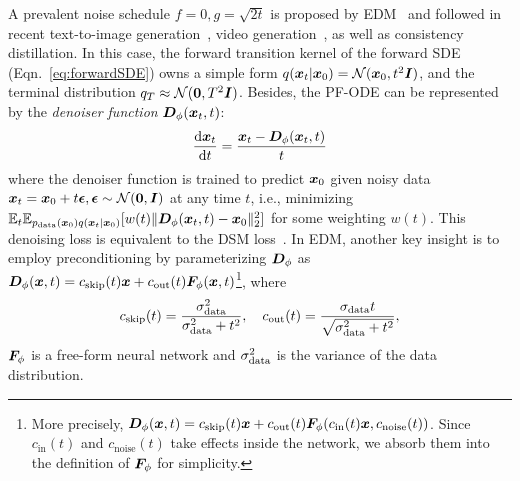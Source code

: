 A prevalent noise schedule $f=0,g=\sqrt{2t}$ is proposed by EDM~\citep{karras2022elucidating} and followed in recent text-to-image generation~\citep{esser2024scaling}, video generation~\citep{blattmann2023stable}, as well as consistency distillation. In this case, the forward transition kernel of the forward SDE (Eqn.~\eqref{eq:forwardSDE}) owns a simple form $q(\bm{x}_t|\bm{x}_0)=\mathcal N(\bm{x}_0,t^2\bm{I})$, and the terminal distribution $q_T\approx \mathcal N(\bm{0},T^2\bm{I})$. Besides, the PF-ODE can be represented by the \textit{denoiser function} $\bm{D}_\phi(\bm{x}_t,t)$:
\begin{equation}
\label{eq:teacher-ODE}
    \frac{\mathrm{d}\bm{x}_t}{\mathrm{d} t}=\frac{\bm{x}_t-\bm{D}_\phi(\bm{x}_t,t)}{t}
\end{equation}
where the denoiser function is trained to predict $\bm{x}_0$ given noisy data $\bm{x}_t=\bm{x}_0+t\bm{\epsilon},\bm{\epsilon}\sim\mathcal N(\bm{0},\bm{I})$ at any time $t$, i.e., minimizing $\mathbb{E}_t\mathbb{E}_{p_{\text{data}}(\bm{x}_0)q(\bm{x}_t|\bm{x}_0)}[w(t)\|\bm{D}_\phi(\bm{x}_t,t)-\bm{x}_0\|_2^2]$ for some weighting $w(t)$. This denoising loss is equivalent to the DSM loss~\citep{song2020score}. In EDM, another key insight is to employ preconditioning by parameterizing $\bm{D}_\phi$ as $\bm{D}_\phi(\bm{x},t)=c_{\text{skip}}(t)\bm{x}+c_{\text{out}}(t)\bm{F}_\phi(\bm{x},t)$\footnote{More precisely, $\bm{D}_\phi(\bm{x},t)=c_{\text{skip}}(t)\bm{x}+c_{\text{out}}(t)\bm{F}_\phi(c_{\text{in}}(t)\bm{x},c_{\text{noise}}(t))$. Since $c_{\text{in}}(t)$ and $c_{\text{noise}}(t)$ take effects inside the network, we absorb them into the definition of $\bm{F}_\phi$ for simplicity.}, where
\begin{equation}
    c_{\text{skip}}(t)=\frac{\sigma_{\text{data}}^2}{\sigma_{\text{data}}^2+t^2},\quad c_{\text{out}}(t)=\frac{\sigma_{\text{data}} t}{\sqrt{\sigma_{\text{data}}^2+t^2}}, 
\end{equation}
$\bm{F}_\phi$ is a free-form neural network and $\sigma_{\text{data}}^2$ is the variance of the data distribution.

